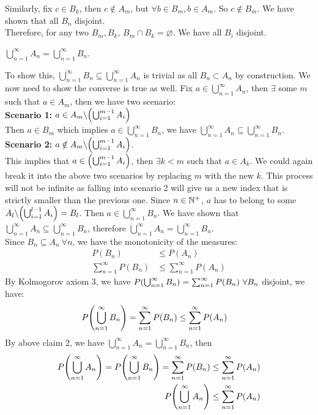 \begin{prf}
\begin{prf*}
Similarly, fix $c\in B_k$, then $c\notin A_m$, but $\forall b\in B_m, b\in A_m$. So $c\notin B_m$. We have shown that all $B_n$ disjoint. \\

Therefore, for any two $B_m, B_k$, $B_m\cap B_k = \varnothing$. We have all $B_i$ disjoint. 

\begin{clm} 
$\bigcup_{n=1}^\infty A_n = \bigcup_{n=1}^\infty B_n$.	
\end{clm}

To show this, $\bigcup_{n=1}^\infty B_n \subseteq \bigcup_{n=1}^\infty A_n$ is trivial as all $B_n \subset A_n$ by construction. We now need to show the converse is true as well. Fix $a\in \bigcup_{n=1}^\infty A_n$, then $\exists$ some $m$ such that $a\in A_m$, then we have two scenario: \\

\noindent \textbf{Scenario 1: } $a\in A_m \backslash \qty(\bigcup_{i=1}^{m-1}A_i)$\\
Then $a\in B_m$ which implies $a\in \bigcup_{n=1}^\infty B_n$, we have $\bigcup_{n=1}^\infty A_n \subseteq \bigcup_{n=1}^\infty B_n$. \\



\noindent \textbf{Scenario 2: } $a\notin A_m \backslash \qty(\bigcup_{i=1}^{m-1}A_i)$.\\
This implies that $a\in \qty(\bigcup_{i=1}^{m-1}A_i)$, then $\exists k<m$ such that $a\in A_k$. We could again break it into the above two scenarios by replacing $m$ with the new $k$. This process will not be infinite as falling into scenario 2 will give us a new index that is strictly smaller than the previous one. Since $n\in \mathbb{N}^+$, $a$ has to belong to some $A_l\backslash \qty(\bigcup_{i=1}^{l-1}A_i) = B_l$. Then $a\in \bigcup_{n=1}^\infty B_n$. We have shown that $\bigcup_{n=1}^\infty A_n \subseteq \bigcup_{n=1}^\infty B_n$, therefore  $\bigcup_{n=1}^\infty A_n = \bigcup_{n=1}^\infty B_n$. \\

Since $B_n \subseteq A_n \ \forall n$, we have the monotonicity of the measures: 
\begin{align*}
	P(B_n) &\leq P(A_n)\\
	\sum_{n=1}^\infty P(B_n) &\leq \sum_{n=1}^\infty P(A_n)
\end{align*} 
By Kolmogorov axiom 3, we have $P\qty(\bigcup_{n=1}^\infty B_n) =  \sum_{n=1}^\infty P(B_n) \ \forall B_n$ disjoint, we have: 
\begin{align*}
	P\qty(\bigcup_{n=1}^\infty B_n) =  \sum_{n=1}^\infty P(B_n) &\leq \sum_{n=1}^\infty P(A_n)
\end{align*} 
By above claim 2, we have $\bigcup_{n=1}^\infty A_n = \bigcup_{n=1}^\infty B_n$, then
\begin{align*}
	P\qty(\bigcup_{n=1}^\infty A_n) = P\qty(\bigcup_{n=1}^\infty B_n) =  \sum_{n=1}^\infty P(B_n) &\leq \sum_{n=1}^\infty P(A_n)\\
	P\qty(\bigcup_{n=1}^\infty A_n)  &\leq \sum_{n=1}^\infty P(A_n)
\end{align*} 
\end{prf*}





\end{prf}
